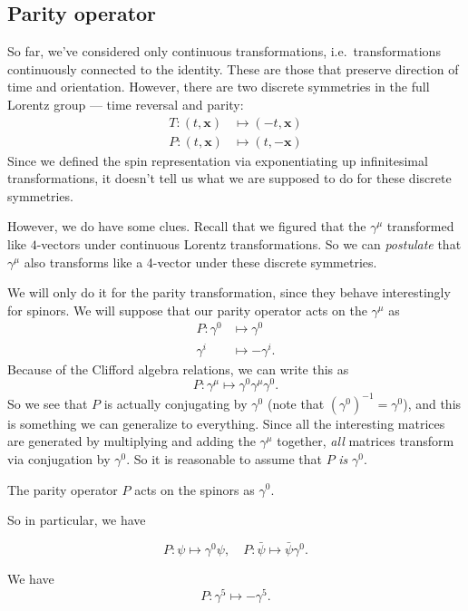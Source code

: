 \documentclass[a4paper]{article}
\begin{document}
\subsection{Parity operator}
So far, we've considered only continuous transformations, i.e.\ transformations continuously connected to the identity. These are those that preserve direction of time and orientation. However, there are two discrete symmetries in the full Lorentz group --- time reversal and parity:
\begin{align*}
  T: (t, \mathbf{x}) &\mapsto (-t, \mathbf{x})\\
  P: (t, \mathbf{x}) &\mapsto (t, -\mathbf{x})
\end{align*}
Since we defined the spin representation via exponentiating up infinitesimal transformations, it doesn't tell us what we are supposed to do for these discrete symmetries.

However, we do have some clues. Recall that we figured that the $\gamma^\mu$ transformed like $4$-vectors under continuous Lorentz transformations. So we can \emph{postulate} that $\gamma^\mu$ also transforms like a 4-vector under these discrete symmetries.

We will only do it for the parity transformation, since they behave interestingly for spinors. We will suppose that our parity operator acts on the $\gamma^\mu$ as
\begin{align*}
  P: \gamma^0 &\mapsto \gamma^0\\
     \gamma^i &\mapsto -\gamma^i.
\end{align*}
Because of the Clifford algebra relations, we can write this as
\[
  P: \gamma^\mu \mapsto \gamma^0 \gamma^\mu \gamma^0.
\]
So we see that $P$ is actually conjugating by $\gamma^0$ (note that $(\gamma^0)^{-1} = \gamma^0$), and this is something we can generalize to everything. Since all the interesting matrices are generated by multiplying and adding the $\gamma^\mu$ together, \emph{all} matrices transform via conjugation by $\gamma^0$. So it is reasonable to assume that $P$ \emph{is} $\gamma^0$.
\begin{axiom}
  The parity operator $P$ acts on the spinors as $\gamma^0$.
\end{axiom}

So in particular, we have
\begin{prop}
  \[
    P : \psi \mapsto \gamma^0 \psi,\quad P: \bar\psi \mapsto \bar\psi \gamma^0.
  \]
\end{prop}

\begin{prop}
  We have
  \[
    P:\gamma^5 \mapsto - \gamma^5.
  \]
\end{prop}
\end{document}
